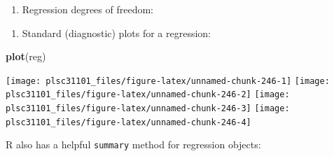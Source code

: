 \documentclass[]{book}
\newenvironment{Shaded}{\begin{snugshade}}{\end{snugshade}}
\newcommand{\KeywordTok}[1]{\textcolor[rgb]{0.13,0.29,0.53}{\textbf{#1}}}
\newcommand{\CommentTok}[1]{\textcolor[rgb]{0.56,0.35,0.01}{\textit{#1}}}
\newcommand{\OperatorTok}[1]{\textcolor[rgb]{0.81,0.36,0.00}{\textbf{#1}}}
\newcommand{\NormalTok}[1]{#1}
\providecommand{\tightlist}{%
  \setlength{\itemsep}{0pt}\setlength{\parskip}{0pt}}
\begin{document}
\begin{enumerate}
\def\labelenumi{\arabic{enumi}.}
\setcounter{enumi}{2}
\tightlist
\item
  Regression degrees of freedom:
\end{enumerate}

\begin{Shaded}
\end{Shaded}

\begin{enumerate}
\def\labelenumi{\arabic{enumi}.}
\setcounter{enumi}{3}
\tightlist
\item
  Standard (diagnostic) plots for a regression:
\end{enumerate}

\begin{Shaded}
\begin{Highlighting}[]
\KeywordTok{plot}\NormalTok{(reg)}
\end{Highlighting}
\end{Shaded}

\begin{center}\texttt{[image: plsc31101\_files/figure-latex/unnamed-chunk-246-1]} \texttt{[image: plsc31101\_files/figure-latex/unnamed-chunk-246-2]} \texttt{[image: plsc31101\_files/figure-latex/unnamed-chunk-246-3]} \texttt{[image: plsc31101\_files/figure-latex/unnamed-chunk-246-4]} \end{center}

R also has a helpful \texttt{summary} method for regression objects:
\end{document}
